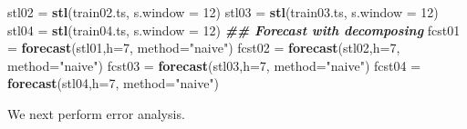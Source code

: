 \documentclass[
]{book}
\newenvironment{Shaded}{\begin{snugshade}}{\end{snugshade}}
\newcommand{\AttributeTok}[1]{\textcolor[rgb]{0.13,0.29,0.53}{#1}}
\newcommand{\DecValTok}[1]{\textcolor[rgb]{0.00,0.00,0.81}{#1}}
\newcommand{\DocumentationTok}[1]{\textcolor[rgb]{0.56,0.35,0.01}{\textbf{\textit{#1}}}}
\newcommand{\FunctionTok}[1]{\textcolor[rgb]{0.13,0.29,0.53}{\textbf{#1}}}
\newcommand{\NormalTok}[1]{#1}
\newcommand{\OtherTok}[1]{\textcolor[rgb]{0.56,0.35,0.01}{#1}}
\newcommand{\StringTok}[1]{\textcolor[rgb]{0.31,0.60,0.02}{#1}}
\begin{document}
\begin{Shaded}
\begin{Highlighting}[]
\NormalTok{stl02 }\OtherTok{=} \FunctionTok{stl}\NormalTok{(train02.ts, }\AttributeTok{s.window =} \DecValTok{12}\NormalTok{)}
\NormalTok{stl03 }\OtherTok{=} \FunctionTok{stl}\NormalTok{(train03.ts, }\AttributeTok{s.window =} \DecValTok{12}\NormalTok{)}
\NormalTok{stl04 }\OtherTok{=} \FunctionTok{stl}\NormalTok{(train04.ts, }\AttributeTok{s.window =} \DecValTok{12}\NormalTok{)}
\DocumentationTok{\#\# Forecast with decomposing}
\NormalTok{fcst01 }\OtherTok{=} \FunctionTok{forecast}\NormalTok{(stl01,}\AttributeTok{h=}\DecValTok{7}\NormalTok{, }\AttributeTok{method=}\StringTok{"naive"}\NormalTok{)}
\NormalTok{fcst02 }\OtherTok{=} \FunctionTok{forecast}\NormalTok{(stl02,}\AttributeTok{h=}\DecValTok{7}\NormalTok{, }\AttributeTok{method=}\StringTok{"naive"}\NormalTok{)}
\NormalTok{fcst03 }\OtherTok{=} \FunctionTok{forecast}\NormalTok{(stl03,}\AttributeTok{h=}\DecValTok{7}\NormalTok{, }\AttributeTok{method=}\StringTok{"naive"}\NormalTok{)}
\NormalTok{fcst04 }\OtherTok{=} \FunctionTok{forecast}\NormalTok{(stl04,}\AttributeTok{h=}\DecValTok{7}\NormalTok{, }\AttributeTok{method=}\StringTok{"naive"}\NormalTok{)}
\end{Highlighting}
\end{Shaded}

We next perform error analysis.
\end{document}
